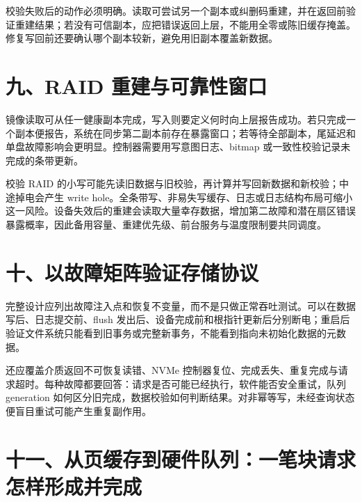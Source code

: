 校验失败后的动作必须明确。读取可尝试另一个副本或纠删码重建，并在返回前验证重建结果；若没有可信副本，应把错误返回上层，不能用全零或陈旧缓存掩盖。修复写回前还要确认哪个副本较新，避免用旧副本覆盖新数据。

\section{九、RAID 重建与可靠性窗口}

镜像读取可从任一健康副本完成，写入则要定义何时向上层报告成功。若只完成一个副本便报告，系统在同步第二副本前存在暴露窗口；若等待全部副本，尾延迟和单盘故障影响会更明显。控制器需要用写意图日志、bitmap 或一致性校验记录未完成的条带更新。

校验 RAID 的小写可能先读旧数据与旧校验，再计算并写回新数据和新校验；中途掉电会产生 write hole。全条带写、非易失写缓存、日志或日志结构布局可缩小这一风险。设备失效后的重建会读取大量幸存数据，增加第二故障和潜在扇区错误暴露概率，因此备用容量、重建优先级、前台服务与温度限制要共同调度。

\section{十、以故障矩阵验证存储协议}

完整设计应列出故障注入点和恢复不变量，而不是只做正常吞吐测试。可以在数据写后、日志提交前、flush 发出后、设备完成前和根指针更新后分别断电；重启后验证文件系统只能看到旧事务或完整新事务，不能看到指向未初始化数据的元数据。

还应覆盖介质返回不可恢复读错、NVMe 控制器复位、完成丢失、重复完成与请求超时。每种故障都要回答：请求是否可能已经执行，软件能否安全重试，队列 generation 如何区分旧完成，数据校验如何判断结果。对非幂等写，未经查询状态便盲目重试可能产生重复副作用。




























\section{十一、从页缓存到硬件队列：一笔块请求怎样形成并完成}

